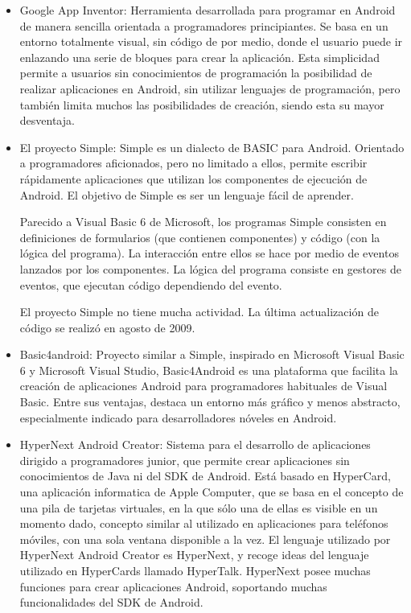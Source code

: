 \documentclass[
10pt, %
a4paper, %
oneside, %
headinclude,footinclude, %
BCOR5mm, %
]{scrartcl}
\begin{document}
\begin{itemize}
	\item Google App Inventor: Herramienta desarrollada para programar en Android de manera sencilla orientada a programadores principiantes. Se basa en un entorno totalmente visual, sin código de por medio, donde el usuario puede ir enlazando una serie de bloques para crear la aplicación. Esta simplicidad permite a usuarios sin conocimientos de programación la posibilidad de realizar aplicaciones en Android, sin utilizar lenguajes de programación, pero también limita muchos las posibilidades de creación, siendo esta su mayor desventaja.

	\item El proyecto Simple: Simple es un dialecto de BASIC para Android. Orientado a programadores aficionados, pero no limitado a ellos, permite escribir rápidamente aplicaciones que utilizan los componentes de ejecución de Android. El objetivo de Simple es ser un lenguaje fácil de aprender.

	Parecido a Visual Basic 6 de Microsoft, los programas Simple consisten en definiciones de formularios (que contienen componentes) y código (con la lógica del programa). La interacción entre ellos se hace por medio de eventos lanzados por los componentes. La lógica del programa consiste en gestores de eventos, que ejecutan código dependiendo del evento.

	El proyecto Simple no tiene mucha actividad. La última actualización de código se realizó en agosto de 2009.

	\item Basic4android: Proyecto similar a Simple, inspirado en Microsoft Visual Basic 6 y Microsoft Visual Studio, Basic4Android es una plataforma que facilita la creación de aplicaciones Android para programadores habituales de Visual Basic. Entre sus ventajas, destaca un entorno más gráfico y menos abstracto, especialmente indicado para desarrolladores nóveles en Android.

	\item HyperNext Android Creator: Sistema para el desarrollo de aplicaciones dirigido a programadores junior, que permite crear aplicaciones sin conocimientos de Java ni del SDK de Android. Está basado en HyperCard, una aplicación informatica de Apple Computer, que se basa en el concepto de una pila de tarjetas virtuales, en la que sólo una de ellas es visible en un momento dado, concepto similar al utilizado en aplicaciones para teléfonos móviles, con una sola ventana disponible a la vez. El lenguaje utilizado por HyperNext Android Creator es HyperNext, y recoge ideas del lenguaje utilizado en HyperCards llamado HyperTalk. HyperNext posee muchas funciones para crear aplicaciones Android, soportando muchas funcionalidades del SDK de Android.


\end{itemize}
\end{document}
